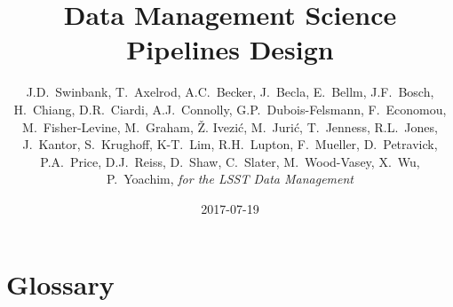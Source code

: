 \documentclass[DM,toc]{lsstdoc}
\title{Data Management Science Pipelines Design}
\author{
    J.D.~Swinbank,
    T.~Axelrod,  A.C.~Becker, J.~Becla, E.~Bellm,
    J.F.~Bosch,  H.~Chiang, D.R.~Ciardi,  A.J.~Connolly,  G.P.~Dubois-Felsmann,
    F.~Economou, M.~Fisher-Levine, M.~Graham, \v{Z}. Ivezi\'c,  M.~Juri\'c,
    T.~Jenness,  R.L.~Jones, J.~Kantor, S.~Krughoff, K-T.~Lim, R.H.~Lupton,
    F.~Mueller,  D.~Petravick, P.A.~Price,  D.J.~Reiss, D.~Shaw, C.~Slater,
    M.~Wood-Vasey, X.~Wu, P.~Yoachim,
     \emph{for the LSST Data Management}
}
\date{2017-07-19}
\begin{document}
\maketitle













\section{Glossary}
\end{document}
